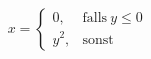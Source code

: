 \[
    x = \begin{cases}
        0, & \mbox{falls}~ y\leq 0 \\
        y^2, & \mbox{sonst}
    \end{cases}
\]
